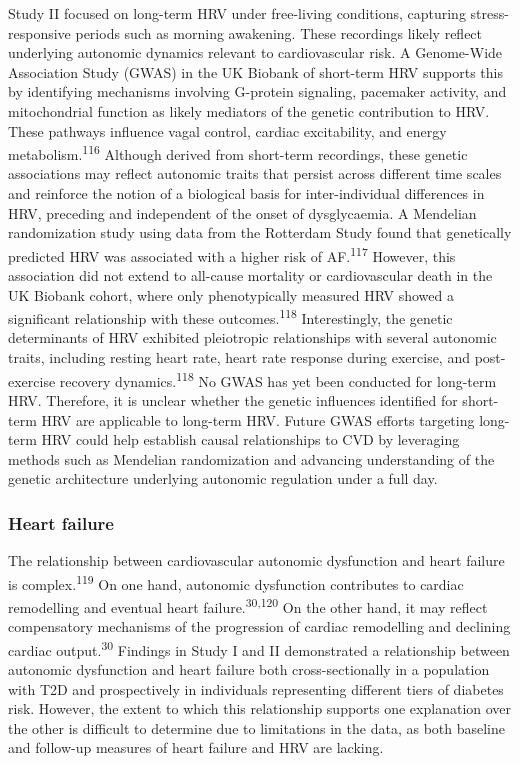 \documentclass[
  a4paper,
  headsepline=true,
  open=any]{scrbook}
\begin{document}
Study II focused on long-term HRV under free-living conditions,
capturing stress-responsive periods such as morning awakening. These
recordings likely reflect underlying autonomic dynamics relevant to
cardiovascular risk. A Genome-Wide Association Study (GWAS) in the UK
Biobank of short-term HRV supports this by identifying mechanisms
involving G-protein signaling, pacemaker activity, and mitochondrial
function as likely mediators of the genetic contribution to HRV. These
pathways influence vagal control, cardiac excitability, and energy
metabolism.\textsuperscript{116} Although derived from short-term
recordings, these genetic associations may reflect autonomic traits that
persist across different time scales and reinforce the notion of a
biological basis for inter-individual differences in HRV, preceding and
independent of the onset of dysglycaemia. A Mendelian randomization
study using data from the Rotterdam Study found that genetically
predicted HRV was associated with a higher risk of
AF.\textsuperscript{117} However, this association did not extend to
all-cause mortality or cardiovascular death in the UK Biobank cohort,
where only phenotypically measured HRV showed a significant relationship
with these outcomes.\textsuperscript{118} Interestingly, the genetic
determinants of HRV exhibited pleiotropic relationships with several
autonomic traits, including resting heart rate, heart rate response
during exercise, and post-exercise recovery
dynamics.\textsuperscript{118} No GWAS has yet been conducted for
long-term HRV. Therefore, it is unclear whether the genetic influences
identified for short-term HRV are applicable to long-term HRV. Future
GWAS efforts targeting long-term HRV could help establish causal
relationships to CVD by leveraging methods such as Mendelian
randomization and advancing understanding of the genetic architecture
underlying autonomic regulation under a full day.

\hypertarget{heart-failure-1}{%
\subsubsection{Heart failure}\label{heart-failure-1}}

The relationship between cardiovascular autonomic dysfunction and heart
failure is complex.\textsuperscript{119} On one hand, autonomic
dysfunction contributes to cardiac remodelling and eventual heart
failure.\textsuperscript{30,120} On the other hand, it may reflect
compensatory mechanisms of the progression of cardiac remodelling and
declining cardiac output.\textsuperscript{30} Findings in Study I and II
demonstrated a relationship between autonomic dysfunction and heart
failure both cross-sectionally in a population with T2D and
prospectively in individuals representing different tiers of diabetes
risk. However, the extent to which this relationship supports one
explanation over the other is difficult to determine due to limitations
in the data, as both baseline and follow-up measures of heart failure
and HRV are lacking.
\end{document}
